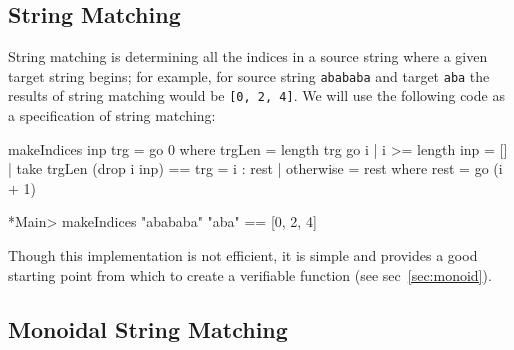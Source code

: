 \subsection{String Matching}\label{subsec:string-matching}

String matching is determining all the indices in a source string
where a given target string begins; for example, for source string
\texttt{abababa} and target \texttt{aba} the results of string
matching would be \texttt{[0, 2, 4]}. We will use the following code
as a specification of string matching:
\begin{code}
makeIndices inp trg = go 0 where
  trgLen = length trg
  go i | i >= length inp = []
       | take trgLen (drop i inp) == trg = i : rest
       | otherwise = rest
  where rest = go (i + 1)

*Main> makeIndices "abababa" "aba" == [0, 2, 4]
\end{code}
Though this implementation is not efficient, it is simple and provides
a good starting point from which to create a verifiable function (see
sec~\ref{sec:monoid}).

\subsection{Monoidal String Matching}\label{subsec:monoidal-string-matching}
